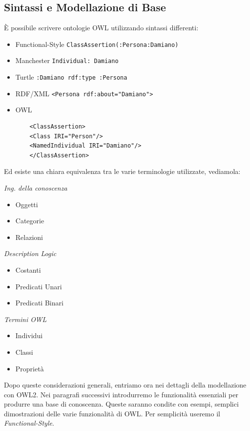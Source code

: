 \subsection{Sintassi e Modellazione di Base} \label{subSec: SintassiOWL}
È possibile scrivere ontologie OWL utilizzando sintassi differenti:
\begin{itemize}
	\item Functional-Style \texttt{ClassAssertion(:Persona:Damiano)}
	\item Manchester \texttt{Individual: Damiano}
	\item Turtle \texttt{:Damiano rdf:type :Persona}
	\item RDF/XML \texttt{<Persona rdf:about="Damiano">}
	\item OWL \begin{verbatim}
	<ClassAssertion>
	<Class IRI="Person"/>
	<NamedIndividual IRI="Damiano"/>
	</ClassAssertion>
	\end{verbatim}
\end{itemize}
Ed esiste una chiara equivalenza tra le varie terminologie utilizzate, vediamola:
\begin{multicols}{3}
	\textit{Ing. della conoscenza}
	\begin{itemize}
		\item Oggetti 
		\item Categorie 
		\item Relazioni
	\end{itemize}
	\textit{Description Logic}
	\begin{itemize}
		\item Costanti
		\item Predicati Unari 
		\item Predicati Binari
	\end{itemize}
    \textit{Termini OWL}
	\begin{itemize}
		\item Individui
		\item Classi 
		\item Proprietà
	\end{itemize}
\end{multicols}
Dopo queste considerazioni generali, entriamo ora nei dettagli della modellazione con OWL2.
Nei paragrafi successivi introdurremo le funzionalità essenziali per produrre una base di conoscenza. Queste saranno condite con esempi,
semplici dimostrazioni delle varie funzionalità di OWL.
Per semplicità useremo il \textit{Functional-Style}.


